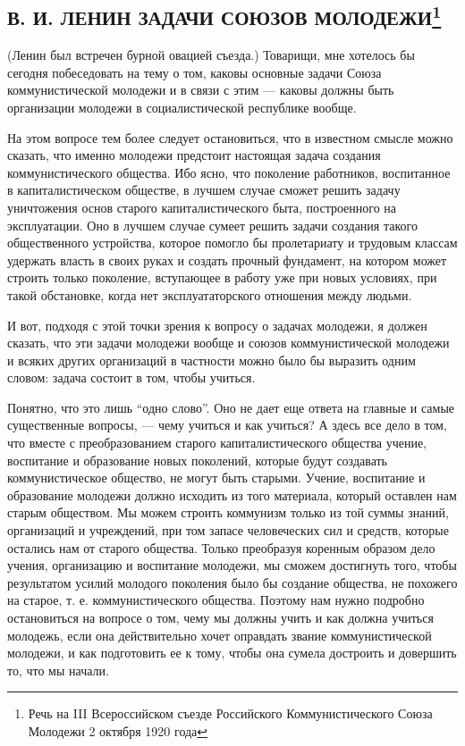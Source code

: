 \documentclass[12pt]{article}
\newcommand{\parnum}{(\arabic{parcount})}
\newcounter{parcount}
\newenvironment{parnumbers}{%
  \par%
  \everypar{\noindent \stepcounter{parcount}\marginpar[]{\parnum}}%
}{}
\begin{document}
\subsection{В. И. ЛЕНИН ЗАДАЧИ СОЮЗОВ МОЛОДЕЖИ\footnote{Речь на III Всероссийском съезде Российского Коммунистического Союза Молодежи 2 октября 1920 года}}
\begin{parnumbers}
(Ленин был встречен бурной овацией съезда.) Товарищи, мне хотелось бы сегодня побеседовать на тему о том, каковы основные задачи Союза коммунистической молодежи и в связи с этим — каковы должны быть организации молодежи в социалистической республике вообще.

На этом вопросе тем более следует остановиться, что в известном смысле можно сказать, что именно молодежи предстоит настоящая задача создания коммунистического общества. Ибо ясно, что поколение работников, воспитанное в капиталистическом обществе, в лучшем случае сможет решить задачу уничтожения основ старого капиталистического быта, построенного на эксплуатации. Оно в лучшем случае сумеет решить задачи создания такого общественного устройства, которое помогло бы пролетариату и трудовым классам удержать власть в своих руках и создать прочный фундамент, на котором может строить только поколение, вступающее в работу уже при новых условиях, при такой обстановке, когда нет эксплуататорского отношения между людьми.

И вот, подходя с этой точки зрения к вопросу о задачах молодежи, я должен сказать, что эти задачи молодежи вообще и союзов коммунистической молодежи и всяких других организаций в частности можно было бы выразить одним словом: задача состоит в том, чтобы учиться.

Понятно, что это лишь “одно слово”. Оно не дает еще ответа на главные и самые существенные вопросы, — чему учиться и как учиться? А здесь все дело в том, что вместе с преобразованием старого капиталистического общества учение, воспитание и образование новых поколений, которые будут создавать коммунистическое общество, не могут быть старыми. Учение, воспитание и образование молодежи должно исходить из того материала, который оставлен нам старым обществом. Мы можем строить коммунизм только из той суммы знаний, организаций и учреждений, при том запасе человеческих сил и средств, которые остались нам от старого общества. Только преобразуя коренным образом дело учения, организацию и воспитание молодежи, мы сможем достигнуть того, чтобы результатом усилий молодого поколения было бы создание общества, не похожего на старое, т. е. коммунистического общества. Поэтому нам нужно подробно остановиться на вопросе о том, чему мы должны учить и как должна учиться молодежь, если она действительно хочет оправдать звание коммунистической молодежи, и как подготовить ее к тому, чтобы она сумела достроить и довершить то, что мы начали.


\end{parnumbers}
\end{document}
